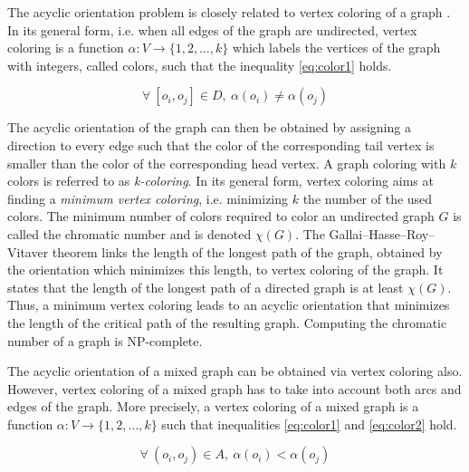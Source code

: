 The acyclic orientation problem is closely related to vertex coloring of a graph \cite{jensen:2011}. In its general form, i.e. when all edges of the graph are undirected, vertex coloring is a function $\alpha: V \rightarrow \{1, 2, \ldots, k\}$ which labels the vertices of the graph with integers, called colors, such that the inequality \ref{eq:color1} holds.

\begin{equation}
\forall\ [o_i,o_j] \in D,\ \alpha(o_i) \neq \alpha(o_j)
\label{eq:color1}
\end{equation}

The acyclic orientation of the graph can then be obtained by assigning a direction to every edge such that the color of the corresponding tail vertex is smaller than the color of the corresponding head vertex. A graph coloring with $k$ colors is referred to as \textit{k-coloring}. In its general form, vertex coloring aims at finding a \textit{minimum vertex coloring}, i.e. minimizing $k$ the number of the used colors. The minimum number of colors required to color an undirected graph $G$ is called the chromatic number and is denoted $\chi(G)$. The Gallai–Hasse–Roy–Vitaver theorem \cite{gallai:1968,roy:1967,hasse:1966,vitaver:1962} links the length of the longest path of the graph, obtained by the orientation which minimizes this length, to vertex coloring of the graph. It states that the length of the longest path of a directed graph is at least $\chi(G)$. Thus, a minimum vertex coloring leads to an acyclic orientation that minimizes the length of the critical path of the resulting graph. Computing the chromatic number of a graph is NP-complete.

The acyclic orientation of a mixed graph can be obtained via vertex coloring also. However, vertex coloring of a mixed graph has to take into account both arcs and edges of the graph. More precisely, a vertex coloring of a mixed graph is a function $\alpha: V \rightarrow \{1, 2, \ldots, k\}$ such that inequalities \ref{eq:color1} and \ref{eq:color2} hold.

\begin{equation}
\forall\ (o_i,o_j) \in A,\ \alpha(o_i) < \alpha(o_j)
\label{eq:color2}
\end{equation}

